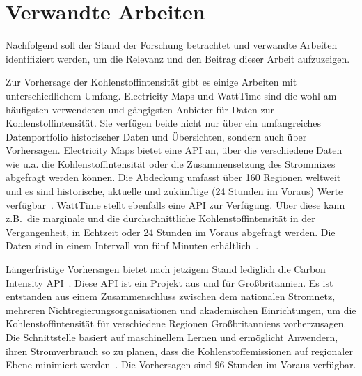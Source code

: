 \section{Verwandte Arbeiten}
Nachfolgend soll der Stand der Forschung betrachtet und verwandte Arbeiten identifiziert werden, um die Relevanz und den Beitrag dieser Arbeit aufzuzeigen.

Zur Vorhersage der Kohlenstoffintensität gibt es einige Arbeiten mit unterschiedlichem Umfang.
Electricity Maps und WattTime sind die wohl am häufigsten verwendeten und gängigsten Anbieter für Daten zur Kohlenstoffintensität.
Sie verfügen beide nicht nur über ein umfangreiches Datenportfolio historischer Daten und Übersichten, sondern auch über Vorhersagen.
Electricity Maps bietet eine \ac{API} an, über die verschiedene Daten wie u.a. die Kohlenstoffintensität oder die Zusammensetzung des Strommixes abgefragt werden können.
Die Abdeckung umfasst über 160 Regionen weltweit und es sind historische, aktuelle und zukünftige (24 Stunden im Voraus) Werte verfügbar~\cite{ElectricityMaps.20231220T09:16:49.000Z}.
WattTime stellt ebenfalls eine \ac{API} zur Verfügung.
Über diese kann z.B.\ die marginale und die durchschnittliche Kohlenstoffintensität in der Vergangenheit, in Echtzeit oder 24 Stunden im Voraus abgefragt werden.
Die Daten sind in einem Intervall von fünf Minuten erhältlich~\cite{WattTime.20231130T19:28:06+00:00}.

Längerfristige Vorhersagen bietet nach jetzigem Stand lediglich die Carbon Intensity \ac{API}~\cite{LyndonRuff.20220420T15:34:17.000Z}.
Diese \ac{API} ist ein Projekt aus und für Großbritannien.
Es ist entstanden aus einem Zusammenschluss zwischen dem nationalen Stromnetz, mehreren Nichtregierungsorganisationen und akademischen Einrichtungen, um die Kohlenstoffintensität für verschiedene Regionen Großbritanniens vorherzusagen.
Die Schnittstelle basiert auf maschinellem Lernen und ermöglicht Anwendern, ihren Stromverbrauch so zu planen, dass die Kohlenstoffemissionen auf regionaler Ebene minimiert werden~\cite{Currie.2024}.
Die Vorhersagen sind 96 Stunden im Voraus verfügbar.

